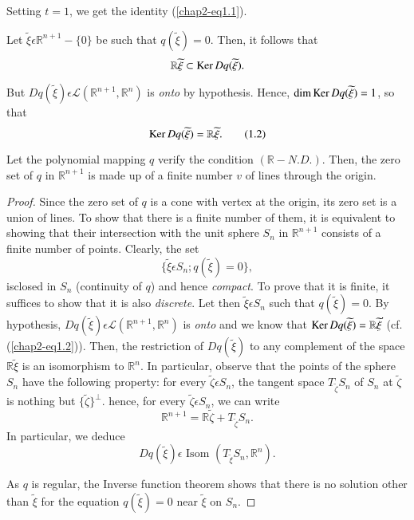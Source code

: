 Setting $t = 1$, we get the identity (\ref{chap2-eq1.1}).

Let $\widetilde{\xi} \epsilon \mathbb{R}^{n+1} - \{0\}$ be such that $q(\widetilde{\xi}) = 0$. Then, it follows that
$$
\mathbb{R} \widetilde{\xi} \subset \operatorname{Ker} Dq(\widetilde{\xi}).
$$

But $Dq(\widetilde{\xi}) \epsilon \mathscr{L} (\mathbb{R}^{n+1}, \mathbb{R}^{n})$ is {\em onto} by hypothesis. Hence, $\dim \Ker Dq\break(\widetilde{\xi}) = 1$, so that
\begin{equation*}
\operatorname{Ker} Dq(\widetilde{\xi}) = \mathbb{R} \widetilde{\xi}.\tag{1.2}\label{chap2-eq1.2}
\end{equation*}

\begin{theorem}\label{chap2-thm1.1}
Let the polynomial mapping $q$ verify the condition $(\mathbb{R} - N.D.)$. Then, the zero set of $q$ in $\mathbb{R}^{n+1}$ is made up of a finite number $v$ of lines through the origin.
\end{theorem}

\begin{proof}
Since the zero set of $q$ is a cone with vertex at the origin, its zero set is a union of lines. To show that there is a finite number of them, it is equivalent to showing that their intersection with the unit sphere $S_{n}$ in $\mathbb{R}^{n+1}$ consists of a finite number of points. Clearly, the set
$$
\{\widetilde{\xi} \epsilon S_{n} ; q(\widetilde{\xi}) = 0 \},
$$
is\pageoriginale closed in $S_{n}$ (continuity of $q$) and hence {\em compact}. To prove that it is finite, it suffices to show that it is also {\em discrete}. Let then $\widetilde{\xi} \epsilon S_{n}$ such that $q(\widetilde{\xi}) = 0$. By hypothesis, $Dq(\widetilde{\xi}) \epsilon \mathscr{L}(\mathbb{R}^{n+1}, \mathbb{R}^{n})$ is {\em onto} and we know that $\operatorname{Ker} Dq(\widetilde{\xi}) = \mathbb{R} \widetilde{\xi}$ (cf. (\ref{chap2-eq1.2})). Then, the restriction of $Dq(\widetilde{\xi})$ to any complement of the space $\mathbb{R}\widetilde{\xi}$ is an isomorphism to $\mathbb{R}^{n}$. In particular, observe that the points of the sphere $S_{n}$ have the following property: for every $\widetilde{\zeta} \epsilon S_{n}$, the  tangent space $T_{\widetilde{\zeta}} S_{n}$ of $S_{n}$ at $\widetilde{\zeta}$ is nothing but $\{\widetilde{\zeta}\}^{\perp}$. hence, for every $\widetilde{\zeta} \epsilon S_{n}$, we can write
$$
\mathbb{R}^{n+1} = \mathbb{R} \widetilde{\zeta} + T_{\widetilde{\zeta}}S_{n}.
$$
In particular, we deduce
\begin{equation*}
Dq(\widetilde{\xi}) \epsilon \text{ Isom } (T_{\widetilde{\xi}} S_{n}, \mathbb{R}^{n}).
\end{equation*}

As $q$ is regular, the Inverse function theorem shows that there is no solution other than $\widetilde{\xi}$ for the equation $q(\widetilde{\xi}) = 0$ near $\widetilde{\xi}$ on $S_{n}$.
\end{proof}

